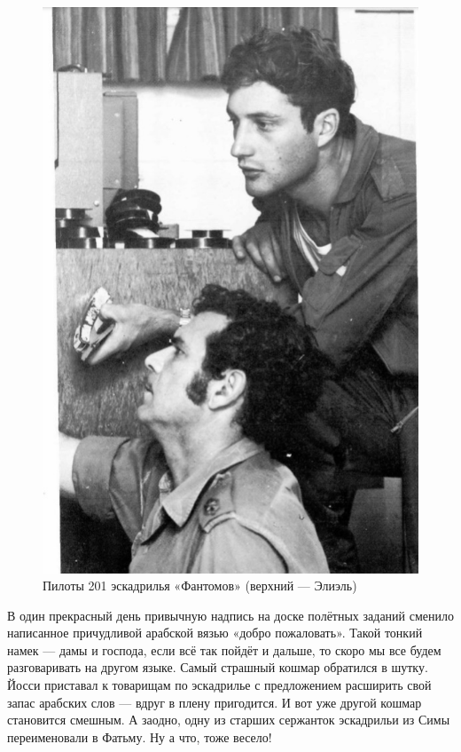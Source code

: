 \begin{figure}[h!tb] 
	\centering\includegraphics[scale=0.5]{History_Yosya/bJ1O1Q7RhDo.jpg}
	\caption{Пилоты 201 эскадрилья «Фантомов» (верхний — Элиэль) }%
\end{figure}

В один прекрасный день привычную надпись на доске полётных заданий сменило написанное причудливой арабской вязью «добро пожаловать». Такой тонкий намек — дамы и господа, если всё так пойдёт и дальше, то скоро мы все будем разговаривать на другом языке. Самый страшный кошмар обратился в шутку. Йосси приставал к товарищам по эскадрилье с предложением расширить свой запас арабских слов — вдруг в плену пригодится. И вот уже другой кошмар становится смешным. А заодно, одну из старших сержанток эскадрильи из Симы переименовали в Фатьму. Ну а что, тоже весело!

